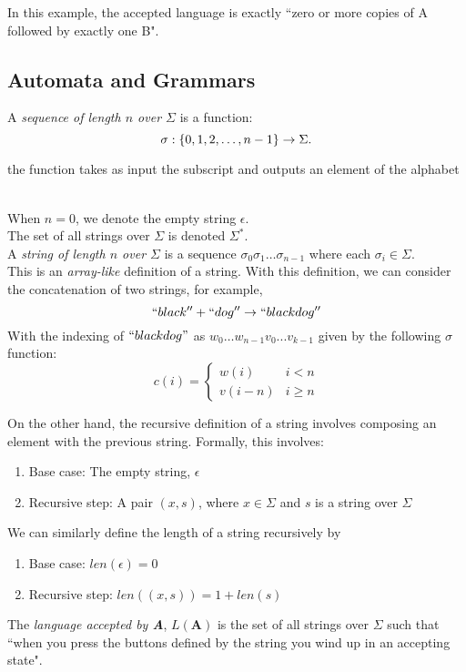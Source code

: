 \documentclass[11pt]{article}
\newcommand{\defn}[0]{\tcbhighmath[boxrule=0.5mm, colframe=cyan!20, colback=cyan!20, arc=10mm, size=fbox]{\textbf{DEF:}}}
\begin{document}
In this example, the accepted language is exactly ``zero or more copies of A followed by exactly one B".

\subsection{Automata and Grammars}

\defn A \textit{sequence of length $n$ over $\Sigma$} is a function:
$$
\sigma: \{ 0, 1, 2, \dots, n-1\} \to \Sigma.\\
$$
\centerline{\small{the function takes as input the subscript and outputs an element of the alphabet}}\\

\normalsize{} When $n=0$, we denote the empty string $\epsilon$.\\
The set of all strings over $\Sigma$ is denoted $\Sigma ^*$.\\

\defn A \textit{string of length $n$ over $\Sigma$} is a sequence $\sigma_0 \sigma_1 \dots \sigma_{n-1}$ where each $\sigma_i \in \Sigma$.\\
This is an \textit{array-like} definition of a string. With this definition, we can consider the concatenation of two strings, for example,
$$
``black'' + ``dog'' \to ``blackdog''
$$
With the indexing of $``blackdog"$ as $w_0 \dots w_{n-1} v_0 ... v_{k-1}$ given by the following $\sigma$ function:
$$
c(i) = \begin{cases} 
      w(i) & i < n \\
      v(i-n) & i \geq n 
   \end{cases}
$$

On the other hand, the recursive definition  of a string involves composing an element with the previous string.
Formally, this involves:
\begin{enumerate}
  \item Base case: The empty string, $\epsilon$
  \item Recursive step: A pair $(x, s)$, where $x \in \Sigma$ and $s$ is a string over $\Sigma$
\end{enumerate}
We can similarly define the length of a string recursively by
\begin{enumerate}
  \item Base case: $len(\epsilon) = 0$
  \item Recursive step: $len((x, s)) = 1 + len(s)$
\end{enumerate}

\defn The \textit{language accepted by \textbf{A}}, $L(\textbf{A})$ is the set of all strings over $\Sigma$ such that ``when you press the buttons defined by the string you wind up in an accepting state".\\
\end{document}
